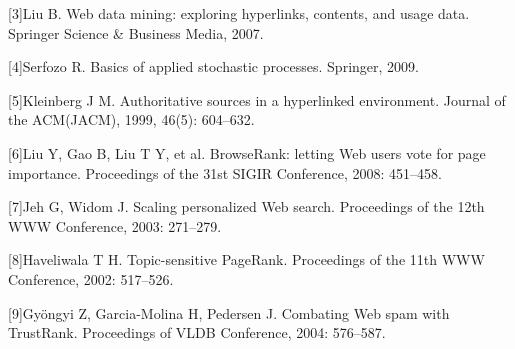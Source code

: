 \documentclass[UTF8, 12pt, fontset=fandol, oneside]{ctexart}
\begin{document}
[3]\quad Liu B. Web data mining: exploring hyperlinks, contents, and usage data. Springer Science \& Business Media, 2007.

[4]\quad Serfozo R. Basics of applied stochastic processes. Springer, 2009.

[5]\quad Kleinberg J M. Authoritative sources in a hyperlinked environment. Journal of the ACM(JACM), 1999, 46(5): 604--632.

[6]\quad Liu Y, Gao B, Liu T Y, et al. BrowseRank: letting Web users vote for page importance. Proceedings of the 31st SIGIR Conference, 2008: 451--458.

[7]\quad Jeh G, Widom J. Scaling personalized Web search. Proceedings of the 12th WWW Conference, 2003: 271--279.

[8]\quad Haveliwala T H. Topic-sensitive PageRank. Proceedings of the 11th WWW Conference, 2002: 517--526.

[9]\quad Gyöngyi Z, Garcia-Molina H, Pedersen J. Combating Web spam with TrustRank. Proceedings of VLDB Conference, 2004: 576--587.
\end{document}

